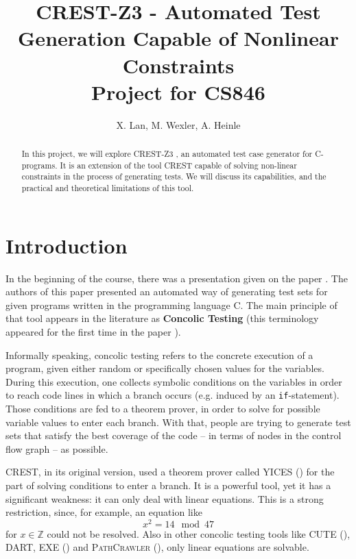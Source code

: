 \documentclass[oribibl]{llncs}
\newcommand{\ZZ}{{\mathbb{Z}}}
\begin{document}
\title{\textsc{CREST-Z3} - Automated Test Generation Capable of Nonlinear Constraints\\[12pt]
Project for CS846}

\author{X. Lan, M. Wexler, A. Heinle}


\maketitle

\begin{abstract}
  In this project, we will explore \textsc{CREST-Z3} \cite{CRESTZ3}, an automated test case generator for C-programs. It is an extension of the tool \textsc{CREST} \cite{CREST} capable of solving non-linear constraints in the process of generating tests. We will discuss its capabilities, and the practical and theoretical limitations of this tool.
\end{abstract}


\section{Introduction}

In the beginning of the course, there was a presentation given on the
paper \cite{godefroid2005dart}. The authors of this paper presented an
automated way of generating test sets for given programs written in
the programming language \textsc{C}. The main principle of that tool
appears in the literature as \textbf{Concolic Testing} (this terminology appeared
for the first time in the paper \cite{sen2005cute}).

Informally speaking, concolic testing refers to the concrete
execution of a program, given either random or specifically chosen
values for the variables. During this execution, one collects symbolic
conditions on the variables in order to reach code lines in which a branch occurs
(e.g. induced by an \texttt{if}-statement). Those conditions are fed
to a theorem prover, in order to solve for possible variable values to
enter each branch. With that, people are trying to generate test sets
that satisfy the best coverage of the code -- in terms of nodes in the
control flow graph -- as possible.

\textsc{CREST}, in its original version, used a theorem prover called
\textsc{YICES} (\cite{dutertre2006yices}) for the part of solving
conditions to enter a branch. It is a powerful tool, yet it has a
significant weakness: it can only deal with linear equations. This is
a strong restriction, since, for example, an equation like
$$x^2 = 14 \mod 47$$
for $x \in \ZZ$ could not be resolved.
Also in other concolic testing tools like \textsc{CUTE}
(\cite{sen2005cute}), \textsc{DART},
\textsc{EXE} (\cite{cadar2008exe}) and \textsc{PathCrawler}
(\cite{williams2005pathcrawler}), only linear equations are solvable.
\end{document}
